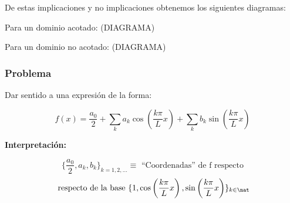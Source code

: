 		De estas implicaciones y no implicaciones obtenemos los siguientes diagramas:

		Para un dominio acotado:
		(DIAGRAMA)

		Para un dominio no acotado:
		(DIAGRAMA)

	\subsubsection*{Problema}

		Dar sentido a una expresión de la forma:

		\[ f(x) = \frac{a_0}{2}+ \sum_k a_k \cos \left( \frac{k \pi}{L} x \right) + \sum_k b_k \sin \left( \frac{k \pi}{L} x \right) \]

		\textbf{Interpretación:}

		\[
		\{\frac{a_0}{2},a_k,b_k\}_{k=1,2,…} \equiv \text{ ``Coordenadas'' de f respecto}\]
		\[\text{ respecto de la base } \{1, \cos \left( \frac{k \pi}{L} x \right), \sin \left( \frac{k \pi}{L} x \right) \}_{k \in \nat }\]

